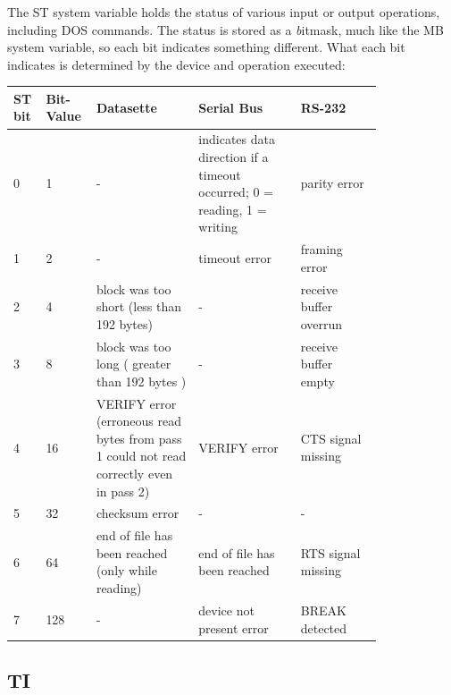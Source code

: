The {\ttfamily ST} system variable holds the status of various input or output
operations, including DOS commands.  The status is stored as a {\emph bitmask},
much like the {\ttfamily MB} system variable, so each bit indicates something
different.  What each bit indicates is determined by the device and operation
executed:\\

\begin{tabular}{|p{0.05\linewidth}|p{0.07\linewidth}|p{0.25\linewidth}|p{0.25\linewidth}|p{0.2\linewidth}|}
	\hline

	{\bfseries ST bit} & {\bfseries Bit-Value} & {\bfseries Datasette} &
	{\bfseries Serial Bus} & {\bfseries RS-232}\\ \hline

	0 & 1 & - & indicates data direction if a timeout occurred; 0 = reading, 1
	= writing & parity error\\ \hline

	1 & 2 & - & timeout error & framing error\\ \hline

	2 & 4 & block was too short (less than 192 bytes) & - & receive buffer overrun\\ \hline

	3 & 8 &  block was too long ( greater than 192 bytes )& - & receive buffer empty\\ \hline

	4 & 16 & {\ttfamily VERIFY} error (erroneous read bytes from pass 1 could
	not read correctly even in pass 2) & {\ttfamily VERIFY} error & CTS signal
	missing\\ \hline

	5 & 32 & checksum error & - & -\\ \hline

	6 & 64 & end of file has been reached (only while reading) & end of file
	has been reached & RTS signal missing\\ \hline

	7 & 128 & - & device not present error & BREAK detected\\ \hline

\end{tabular}

\vspace{16pt}

\subsection{TI}

